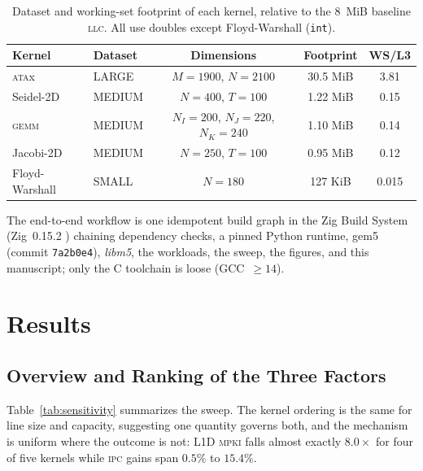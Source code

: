 \documentclass[12pt]{article}
\begin{document}
\begin{table}[!htb]
	\centering
	\caption{Dataset and working-set footprint of each kernel, relative to the
	8~MiB baseline \textsc{llc}. All use doubles except Floyd-Warshall (\texttt{int}).}
	\label{tab:workloads}
	\small
	\begin{tabular}{llccc}
		\toprule
		\textbf{Kernel} & \textbf{Dataset} & \textbf{Dimensions} &
		\textbf{Footprint} & \textbf{WS/L3} \\
		\midrule
		\textsc{ata}x  & LARGE  & \(M = 1900\), \(N = 2100\)                  & 30.5 MiB & 3.81  \\
		Seidel-2D      & MEDIUM & \(N = 400\), \(T = 100\)                    & 1.22 MiB & 0.15  \\
		\textsc{gemm}  & MEDIUM & \(N_I = 200\), \(N_J = 220\), \(N_K = 240\) & 1.10 MiB & 0.14  \\
		Jacobi-2D      & MEDIUM & \(N = 250\), \(T = 100\)                    & 0.95 MiB & 0.12  \\
		Floyd-Warshall & SMALL  & \(N = 180\)                                 & 127 KiB  & 0.015 \\
		\bottomrule
	\end{tabular}
\end{table}

The end-to-end workflow is one idempotent build graph in the Zig Build System
(Zig~0.15.2 \cite{zig:2025}) chaining dependency checks, a pinned Python runtime,
gem5 (commit \texttt{7a2b0e4}), \textit{libm5}, the workloads, the sweep, the
figures, and this manuscript; only the C toolchain is loose (GCC~\(\geq 14\)).

\section{Results}\label{sec:results}
\subsection{Overview and Ranking of the Three Factors}\label{sub:overview}

Table~\ref{tab:sensitivity} summarizes the sweep. The kernel ordering is the same
for line size and capacity, suggesting one quantity governs both, and the
mechanism is uniform where the outcome is not: L1D \textsc{mpki} falls almost
exactly \(8.0\times\) for four of five kernels while \textsc{ipc} gains span
\(0.5\%\) to \(15.4\%\).
\end{document}
